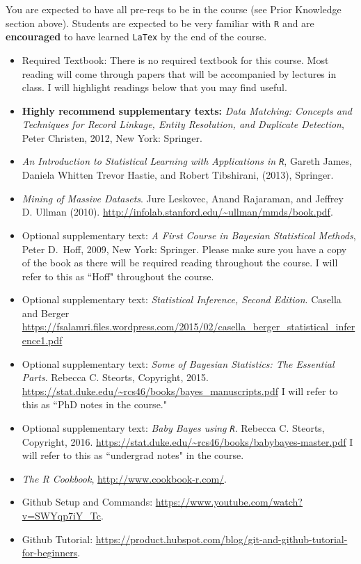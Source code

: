\documentclass[11pt]{article}
\begin{document}
You are expected to have all pre-reqs to be in the course (see Prior Knowledge section above). Students are expected to be very familiar with \texttt{R} and are \textbf{encouraged} to have learned \texttt{LaTex} by the end of the course. 

\begin{itemize}
\item[] Required Textbook: There is no required textbook for this course. Most reading will come through papers that will be accompanied by lectures in class. I will highlight readings below that you may find useful. 
\item[] \textbf{Highly recommend supplementary texts:} \textit{Data Matching: Concepts and Techniques for Record Linkage, Entity Resolution, and Duplicate Detection}, Peter Christen, 2012, New York: Springer.
\item[] \emph{An Introduction to Statistical Learning with Applications in \texttt{R}}, Gareth James, Daniela Whitten Trevor Hastie, and Robert Tibshirani, (2013), Springer.
\item[] \emph{Mining of Massive Datasets}. Jure Leskovec, Anand Rajaraman, and Jeffrey D. Ullman (2010). \url{http://infolab.stanford.edu/~ullman/mmds/book.pdf}.
\item[] Optional supplementary text: \textit{A First Course in Bayesian Statistical Methods}, Peter D.\ Hoff, 2009, New York: Springer. Please make sure you have a copy of the book as there will be required reading throughout the course. I will refer to this as ``Hoff" throughout the course.
\item[] Optional supplementary text:  \textit{Statistical Inference, Second Edition}. Casella and Berger \url{https://fsalamri.files.wordpress.com/2015/02/casella_berger_statistical_inference1.pdf}
\item[] Optional supplementary text:  \textit{Some of Bayesian Statistics: The Essential Parts}. Rebecca C. Steorts, Copyright, 2015. \url{https://stat.duke.edu/~rcs46/books/bayes_manuscripts.pdf} I will refer to this as ``PhD notes in the course."
\item[] Optional supplementary text:  \textit{Baby Bayes using \texttt{R}}. Rebecca C. Steorts, Copyright, 2016.
\url{https://stat.duke.edu/~rcs46/books/babybayes-master.pdf} I will refer to this as ``undergrad notes" in the course.
\item[] \emph{The R Cookbook}, \url{http://www.cookbook-r.com/}.
\item[] Github Setup and Commands: \url{https://www.youtube.com/watch?v=SWYqp7iY_Tc}.
\item[] Github Tutorial: \url{https://product.hubspot.com/blog/git-and-github-tutorial-for-beginners}.
\end{itemize}
\end{document}
